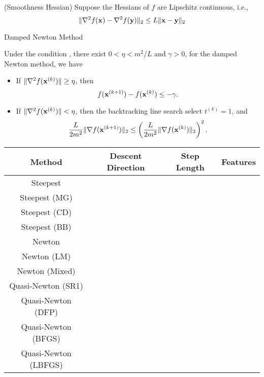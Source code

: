  (Smoothness Hessian) Suppose the Hessians of $f$ are Lipschitz continuous, i.e.,
\begin{equation}
	\|\nabla^{2}f({\bf x})-\nabla^{2}f({\bf y})\|_{2}\leq L\|{\bf x}-{\bf y}\|_{2}
	\label{eq:smoothness-hessian}
\end{equation}

\begin{algorithm}[htbp]
	\caption{Damped Newton Method}
	\KwOut{}
\end{algorithm}

\begin{theorem}
	Under the condition , there exist $0<\eta<m^{2}/L$ and $\gamma>0$, for the damped Newton method, we have
	\begin{itemize}
		\item If $\|\nabla^{2}f({\bf x}^{(k)})\|\geq\eta$, then
		      \begin{equation*}
			      f({\bf x}^{(k+1)})-f({\bf x}^{(k)})\leq-\gamma.
		      \end{equation*}
		\item If $\|\nabla^{2}f({\bf x}^{(k)})\|<\eta$, then the backtracking line search select $t^{(k)}=1$, and
		      \begin{equation*}
			      \frac{L}{2m^{2}}\|\nabla f({\bf x}^{(k+1)})\|_{2}\leq \left(\frac{L}{2m^{2}}\|\nabla f({\bf x}^{(k)})\|_{2}\right)^{2}.
		      \end{equation*}
	\end{itemize}
\end{theorem}

\begin{table}[htbp]
	\centering
	\begin{tabular}{cccc}
		\toprule
		Method & Descent Direction & Step Length & Features \\
		\midrule
		Steepest                                            \\
		Steepest (MG)                                       \\
		Steepest (CD)                                       \\
		Steepest (BB)                                       \\
		\midrule
		Newton                                              \\
		Newton (LM)                                         \\
		Newton (Mixed)                                      \\
		\midrule
		Quasi-Newton (SR1)                                  \\
		Quasi-Newton (DFP)                                  \\
		Quasi-Newton (BFGS)                                 \\
		Quasi-Newton (LBFGS)                                \\
		\bottomrule
	\end{tabular}
\end{table}

